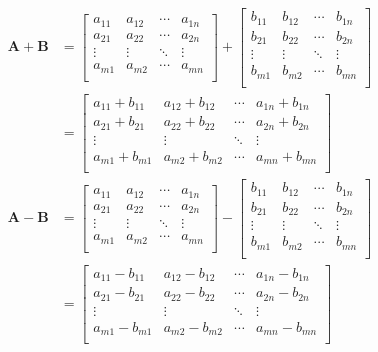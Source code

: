 \begin{align*}
  \mathbf{A}+\mathbf{B} &=
  \left[
    \begin{matrix}
      a_{11} & a_{12} & \cdots & a_{1n} \\
      a_{21} & a_{22} & \cdots & a_{2n} \\
      \vdots & \vdots & \ddots & \vdots \\
      a_{m1} & a_{m2} & \cdots & a_{mn} \\
    \end{matrix}
  \right]
  +
  \left[
    \begin{matrix}
      b_{11} & b_{12} & \cdots & b_{1n} \\
      b_{21} & b_{22} & \cdots & b_{2n} \\
      \vdots & \vdots & \ddots & \vdots \\
      b_{m1} & b_{m2} & \cdots & b_{mn} \\
    \end{matrix}
  \right]
  \\
  &=
  \left[
    \begin{matrix}
      a_{11}+b_{11} & a_{12}+b_{12} & \cdots & a_{1n}+b_{1n} \\
      a_{21}+b_{21} & a_{22}+b_{22} & \cdots & a_{2n}+b_{2n} \\
      \vdots & \vdots & \ddots & \vdots \\
      a_{m1}+b_{m1} & a_{m2}+b_{m2} & \cdots & a_{mn}+b_{mn} \\
    \end{matrix}
  \right]
  \\
  \mathbf{A}-\mathbf{B} &=
  \left[
    \begin{matrix}
      a_{11} & a_{12} & \cdots & a_{1n} \\
      a_{21} & a_{22} & \cdots & a_{2n} \\
      \vdots & \vdots & \ddots & \vdots \\
      a_{m1} & a_{m2} & \cdots & a_{mn} \\
    \end{matrix}
  \right]
  -
  \left[
    \begin{matrix}
      b_{11} & b_{12} & \cdots & b_{1n} \\
      b_{21} & b_{22} & \cdots & b_{2n} \\
      \vdots & \vdots & \ddots & \vdots \\
      b_{m1} & b_{m2} & \cdots & b_{mn} \\
    \end{matrix}
  \right]
  \\
  &=
  \left[
    \begin{matrix}
      a_{11}-b_{11} & a_{12}-b_{12} & \cdots & a_{1n}-b_{1n} \\
      a_{21}-b_{21} & a_{22}-b_{22} & \cdots & a_{2n}-b_{2n} \\
      \vdots & \vdots & \ddots & \vdots \\
      a_{m1}-b_{m1} & a_{m2}-b_{m2} & \cdots & a_{mn}-b_{mn} \\
    \end{matrix}
  \right]
\end{align*}


